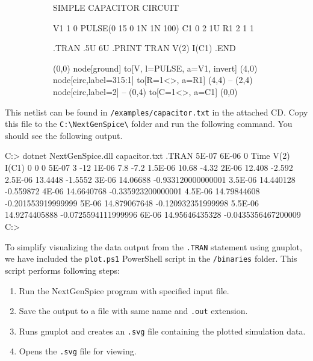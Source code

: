 \begin{figure}[h]
	\centering
	\begin{subfigure}{.40\textwidth}
		\begin{spicecode}
SIMPLE CAPACITOR CIRCUIT

V1 1 0 PULSE(0 15 0 1N 1N 100)
C1 0 2 1U
R1 2 1 1

.TRAN .5U 6U
.PRINT TRAN V(2) I(C1)
.END
		\end{spicecode}		
	\end{subfigure}\hspace{5mm}
	\begin{subfigure}{.45\textwidth}	
		\centering	
		\begin{circuitdev}
			(0,0) node[ground]{} to[V, l=PULSE, a=V1, invert]
			(4,0) node[circ,label=315:1]{} to[R=1<\ohm>, a=R1]
			(4,4) -- (2,4) node[circ,label=2]{} --
			(0,4) to[C=1<\micro\farad>, a=C1] (0,0)
		\end{circuitdev}
	\end{subfigure}	
\end{figure}

This netlist can be found in \texttt{/examples/capacitor.txt} in the attached CD. Copy this file to the \texttt{C:\textbackslash{}NextGenSpice\textbackslash{}} folder and run the following command. You should see the following output.
\pagebreak
\begin{code}
C:\NextGenSpice> dotnet NextGenSpice.dll capacitor.txt
.TRAN 5E-07 6E-06 0
Time V(2) I(C1)
0 0 0
5E-07 3 -12
1E-06 7.8 -7.2
1.5E-06 10.68 -4.32
2E-06 12.408 -2.592
2.5E-06 13.4448 -1.5552
3E-06 14.06688 -0.933120000000001
3.5E-06 14.440128 -0.559872
4E-06 14.6640768 -0.335923200000001
4.5E-06 14.79844608 -0.201553919999999
5E-06 14.879067648 -0.120932351999998
5.5E-06 14.9274405888 -0.0725594111999996
6E-06 14.95646435328 -0.0435356467200009
C:\NextGenSpice>
\end{code}

To simplify visualizing the data output from the \texttt{.TRAN} statement using gnuplot, we have included the \texttt{plot.ps1} PowerShell script in the \texttt{/binaries} folder. This script performs following steps:

\begin{enumerate}
	\item Run the NextGenSpice program with specified input file.
	\item Save the output to a file with same name and \texttt{.out} extension.
	\item Runs gnuplot and creates an \texttt{.svg} file containing the plotted simulation data.
	\item Opens the \texttt{.svg} file for viewing.
\end{enumerate}

